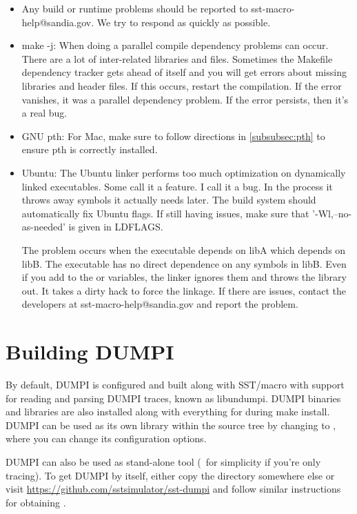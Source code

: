 \begin{itemize}
\item Any build or runtime problems should be reported to sst-macro-help@sandia.gov.  We try to respond as quickly as possible.
\item make -j: When doing a parallel compile dependency problems can occur.  
There are a lot of inter-related libraries and files.  
Sometimes the Makefile dependency tracker gets ahead of itself and you will get errors about missing libraries and header files.
If this occurs, restart the compilation.  If the error vanishes, it was a parallel dependency problem.
If the error persists, then it's a real bug.
\item GNU pth: For Mac, make sure to follow directions in \ref{subsubsec:pth} to ensure pth is correctly installed.
\item Ubuntu: The Ubuntu linker performs too much optimization on dynamically linked executables.
Some call it a feature.  I call it a bug.
In the process it throws away symbols it actually needs later. The build system should automatically fix Ubuntu flags.
If still having issues, make sure that '-Wl,--no-as-needed' is given in LDFLAGS.

The problem occurs when the executable depends on libA which depends on libB.
The executable has no direct dependence on any symbols in libB.
Even if you add  to the  or  variables,
the linker ignores them and throws the library out.
It takes a dirty hack to force the linkage.
If there are issues, contact the developers at sst-macro-help@sandia.gov and report the problem. 
\end{itemize}

\section{Building DUMPI}
\label{sec:building:dumpi}

By default, DUMPI is configured and built along with SST/macro with support for reading and parsing DUMPI traces, known as libundumpi.  
DUMPI binaries and libraries are also installed along with everything for \sstmacro during make install.   
DUMPI can be used as its own library within the \sstmacro source tree by changing to , 
where you can change its configuration options.  

DUMPI can also be used as stand-alone tool (\eg~for simplicity if you're only tracing). 
To get DUMPI by itself, either copy the  directory somewhere else or visit \url{https://github.com/sstsimulator/sst-dumpi} and follow similar instructions for obtaining \sstmacro.

